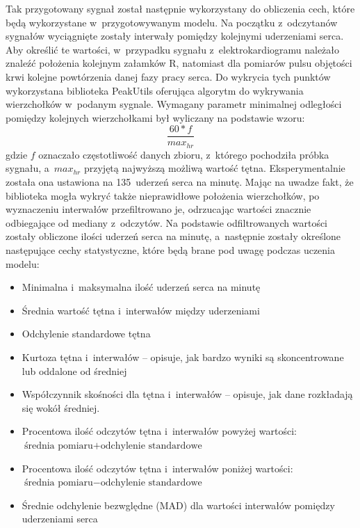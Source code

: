 Tak przygotowany sygnał został następnie wykorzystany do obliczenia cech, które będą wykorzystane w~przygotowywanym modelu. Na początku z~odczytanów sygnałów wyciągnięte zostały interwały pomiędzy kolejnymi uderzeniami serca. Aby określić te wartości, w~przypadku sygnału z~elektrokardiogramu należało znaleźć położenia kolejnym załamków R, natomiast dla pomiarów pulsu objętości krwi kolejne powtórzenia danej fazy pracy serca. Do wykrycia tych punktów wykorzystana biblioteka PeakUtils oferująca algorytm do wykrywania wierzchołków w~podanym sygnale. Wymagany parametr minimalnej odległości pomiędzy kolejnych wierzchołkami był wyliczany na podstawie wzoru:
$$
\frac{60*f}{max_{hr}}
$$
gdzie $f$ oznaczało częstotliwość danych zbioru, z~którego pochodziła próbka sygnału, a~$max_{hr}$ przyjętą najwyższą możliwą wartość tętna. Eksperymentalnie została ona ustawiona na 135~uderzeń serca na minutę. Mając na uwadze fakt, że biblioteka mogła wykryć także nieprawidłowe położenia wierzchołków, po wyznaczeniu interwałów przefiltrowano je, odrzucając wartości znacznie odbiegające od mediany z~odczytów. Na podstawie odfiltrowanych wartości zostały obliczone ilości uderzeń serca na minutę, a~następnie zostały określone następujące cechy statystyczne, które będą brane pod uwagę podczas uczenia modelu:
\begin{itemize}
	\item Minimalna i~maksymalna ilość uderzeń serca na minutę
	\item Średnia wartość tętna i~interwałów między uderzeniami
	\item Odchylenie standardowe tętna
	\item Kurtoza tętna i~interwałów -- opisuje, jak bardzo wyniki są skoncentrowane lub oddalone od średniej
	\item Współczynnik skośności dla tętna i~interwałów -- opisuje, jak dane rozkładają się wokół średniej.
	\item Procentowa ilość odczytów tętna i~interwałów powyżej wartości: $\text{średnia pomiaru} + \text{odchylenie standardowe}$
	\item Procentowa ilość odczytów  tętna i~interwałów poniżej wartości: $\text{średnia pomiaru} - \text{odchylenie standardowe}$
	\item Średnie odchylenie bezwględne (MAD) dla wartości interwałów pomiędzy uderzeniami serca
\end{itemize}

